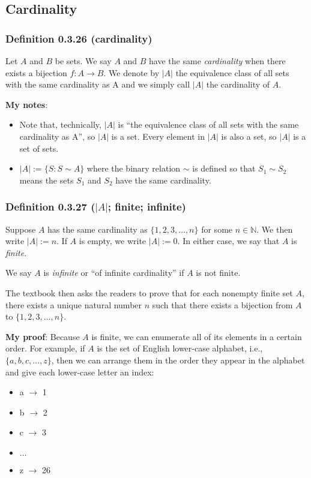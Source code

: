 \documentclass[12pt, letterpaper, oneside]{book}
\begin{document}
\subsection{Cardinality}

\subsubsection{Definition 0.3.26 (cardinality)}

Let $A$ and $B$ be sets. We say $A$ and $B$ have the same \textit{cardinality}
when there exists a bijection $f: A \rightarrow B$. We denote by $|A|$ the
equivalence class of all sets with the same cardinality as A and we simply call
$|A|$ the cardinality of $A$.

\colorbox{lime!100}{\textbf{My notes}}:
\begin{itemize}
  \item Note that, technically, $|A|$ is ``the equivalence class of all sets
        with the same cardinality as A'', so $|A|$ is a set. Every element in $|A|$
        is also a set, so $|A|$ is a set of sets.
  \item $|A|:= \{S: S \sim A\}$ where the binary relation $\sim$ is defined so
        that $S_1 \sim S_2$ means the sets $S_1$ and $S_2$ have the same
        cardinality.
\end{itemize}

\subsubsection{Definition 0.3.27 ($|A|$; finite; infinite)}

Suppose $A$ has the same cardinality as $\{1, 2, 3, \ldots , n\}$ for some $n
  \in \mathbb{N}$. We then write $|A|:= n$. If $A$ is empty, we write $|A|:= 0$.
In either case, we say that $A$ is \textit{finite}.

We say $A$ is \textit{infinite} or ``of infinite cardinality'' if $A$ is not
finite.

The textbook then asks the readers to prove that for each nonempty finite set
$A$, there exists a unique natural number $n$ such that there exists a bijection
from $A$ to $\{1, 2, 3, \ldots, n\}$.

\colorbox{lime!100}{\textbf{My proof}}: Because $A$ is finite, we can enumerate
all of its elements in a certain order. For example, if $A$ is the set of
English lower-case alphabet, i.e., $\{a, b, c, \ldots, z\}$, then we can arrange
them in the order they appear in the alphabet and give each lower-case letter an
index:
\begin{itemize}
  \item a $\rightarrow$ 1
  \item b $\rightarrow$ 2
  \item c $\rightarrow$ 3
  \item $\ldots$
  \item z $\rightarrow$ 26
\end{itemize}
\end{document}
